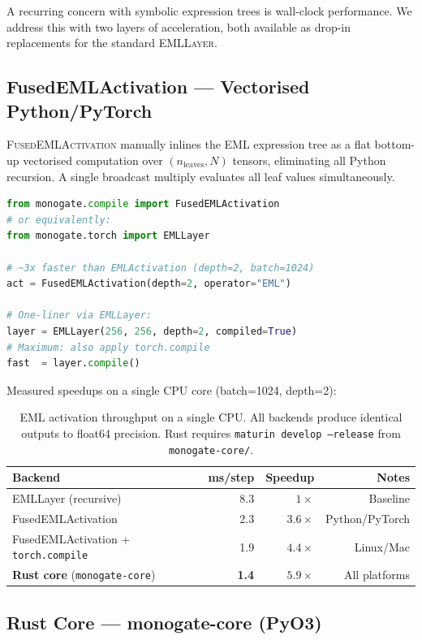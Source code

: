 \documentclass[11pt,a4paper]{article}
\begin{document}
A recurring concern with symbolic expression trees is wall-clock
performance.
We address this with two layers of acceleration, both available
as drop-in replacements for the standard \textsc{EMLLayer}.

\subsection{FusedEMLActivation --- Vectorised Python/PyTorch}

\textsc{FusedEMLActivation} manually inlines the EML expression tree
as a flat bottom-up vectorised computation over
$(n_{\text{leaves}}, N)$ tensors, eliminating all Python recursion.
A single broadcast multiply evaluates all leaf values simultaneously.

\begin{lstlisting}[language=Python]
from monogate.compile import FusedEMLActivation
# or equivalently:
from monogate.torch import EMLLayer

# ~3x faster than EMLActivation (depth=2, batch=1024)
act = FusedEMLActivation(depth=2, operator="EML")

# One-liner via EMLLayer:
layer = EMLLayer(256, 256, depth=2, compiled=True)
# Maximum: also apply torch.compile
fast  = layer.compile()
\end{lstlisting}

Measured speedups on a single CPU core (batch=1024, depth=2):

\begin{table}[h]
\centering
\begin{tabular}{@{}lrrr@{}}
\toprule
Backend & ms/step & Speedup & Notes \\
\midrule
EMLLayer (recursive) & 8.3 & $1\times$ & Baseline \\
FusedEMLActivation   & 2.3 & $3.6\times$ & Python/PyTorch \\
FusedEMLActivation + \texttt{torch.compile} & 1.9 & $4.4\times$ & Linux/Mac \\
\textbf{Rust core} (\texttt{monogate-core}) & \textbf{1.4} & $\mathbf{5.9\times}$ & All platforms \\
\bottomrule
\end{tabular}
\caption{EML activation throughput on a single CPU.  All backends
  produce identical outputs to float64 precision.  Rust requires
  \texttt{maturin develop --release} from \texttt{monogate-core/}.}
\label{tab:perf}
\end{table}

\subsection{Rust Core --- monogate-core (PyO3)}
\end{document}
